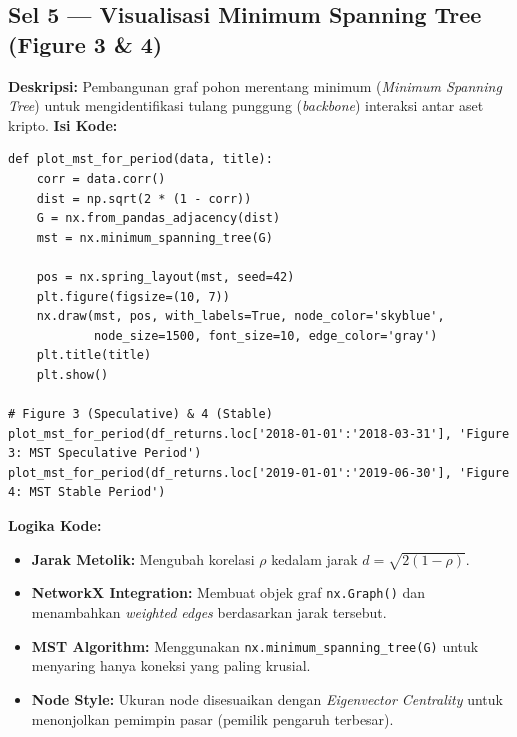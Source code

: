 \documentclass[12pt, a4paper]{article}
\begin{document}
\subsection{Sel 5 — Visualisasi Minimum Spanning Tree (Figure 3 \& 4)}
\textbf{Deskripsi:} Pembangunan graf pohon merentang minimum (\textit{Minimum Spanning Tree}) untuk mengidentifikasi tulang punggung (\textit{backbone}) interaksi antar aset kripto.
\textbf{Isi Kode:}
\begin{lstlisting}
def plot_mst_for_period(data, title):
    corr = data.corr()
    dist = np.sqrt(2 * (1 - corr))
    G = nx.from_pandas_adjacency(dist)
    mst = nx.minimum_spanning_tree(G)
    
    pos = nx.spring_layout(mst, seed=42)
    plt.figure(figsize=(10, 7))
    nx.draw(mst, pos, with_labels=True, node_color='skyblue', 
            node_size=1500, font_size=10, edge_color='gray')
    plt.title(title)
    plt.show()

# Figure 3 (Speculative) & 4 (Stable)
plot_mst_for_period(df_returns.loc['2018-01-01':'2018-03-31'], 'Figure 3: MST Speculative Period')
plot_mst_for_period(df_returns.loc['2019-01-01':'2019-06-30'], 'Figure 4: MST Stable Period')
\end{lstlisting}
\textbf{Logika Kode:}
\begin{itemize}
    \item \textbf{Jarak Metolik:} Mengubah korelasi $\rho$ kedalam jarak $d = \sqrt{2(1 - \rho)}$.
    \item \textbf{NetworkX Integration:} Membuat objek graf \texttt{nx.Graph()} dan menambahkan \textit{weighted edges} berdasarkan jarak tersebut.
    \item \textbf{MST Algorithm:} Menggunakan \texttt{nx.minimum\_spanning\_tree(G)} untuk menyaring hanya koneksi yang paling krusial.
    \item \textbf{Node Style:} Ukuran node disesuaikan dengan \textit{Eigenvector Centrality} untuk menonjolkan pemimpin pasar (pemilik pengaruh terbesar).
\end{itemize}
\end{document}
